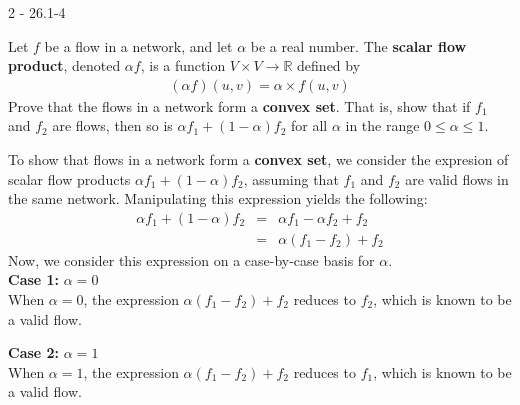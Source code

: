 \documentclass[11pt]{article}
\begin{document}
\begin{prob}{2 - 26.1-4}

Let $f$ be a flow in a network, and let $\alpha$ be a real number. The \textbf{scalar flow product}, denoted $\alpha f$, is a function $V \times V \to \mathbb{R}$ defined by
\begin{eqnarray*}
(\alpha f)(u,v) = \alpha \times f(u,v)
\end{eqnarray*}
Prove that the flows in a network form a \textbf{convex set}. That is, show that if $f_1$ and $f_2$ are flows, then so is $\alpha f_1 + (1 - \alpha)f_2$ for all $\alpha$ in the range $0 \leq \alpha \leq 1$.
\end{prob}
\begin{sol}

To show that flows in a network form a \textbf{convex set}, we consider the expresion of scalar flow products $\alpha f_1 + (1 - \alpha)f_2$, assuming that $f_1$ and $f_2$ are valid flows in the same network. Manipulating this expression yields the following:
\begin{eqnarray}
\alpha f_1 + (1 - \alpha)f_2 & = & \alpha f_1 - \alpha f_2 + f_2 \\
& = & \alpha(f_1 - f_2) + f_2
\end{eqnarray}
Now, we consider this expression on a case-by-case basis for $\alpha$.\\


\textbf{Case 1:} $\alpha = 0$ \\
When $\alpha = 0$, the expression $\alpha(f_1 - f_2) + f_2$ reduces to $f_2$, which is known to be a valid flow. 

\textbf{Case 2:} $\alpha = 1$ \\
When $\alpha = 1$, the expression $\alpha(f_1 - f_2) + f_2$ reduces to $f_1$, which is known to be a valid flow. 


\end{sol}
\end{document}
